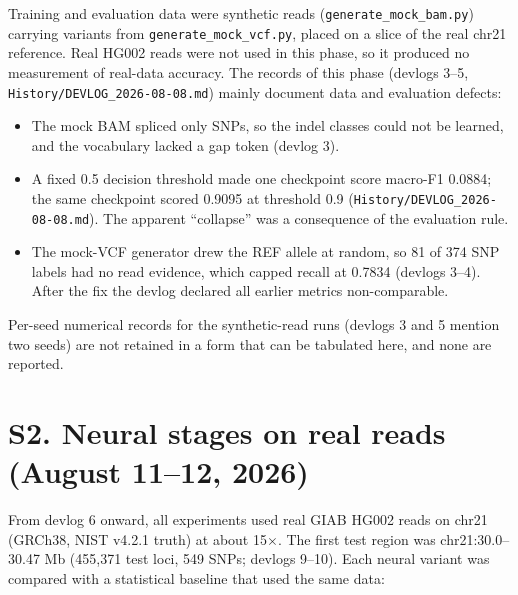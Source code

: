 \documentclass[11pt,a4paper]{article}
\newcommand{\src}[1]{{\small\texttt{#1}}}
\begin{document}
Training and evaluation data were synthetic reads (\src{generate\_mock\_bam.py}) carrying
variants from \src{generate\_mock\_vcf.py}, placed on a slice of the real chr21 reference. Real
HG002 reads were not used in this phase, so it produced no measurement of real-data accuracy.
The records of this phase (devlogs 3--5, \src{History/DEVLOG\_2026-08-08.md}) mainly document
data and evaluation defects:
\begin{itemize}[leftmargin=1.4em,itemsep=1pt]
\item The mock BAM spliced only SNPs, so the indel classes could not be learned, and the
  vocabulary lacked a gap token (devlog 3).
\item A fixed 0.5 decision threshold made one checkpoint score macro-F1 0.0884; the same
  checkpoint scored 0.9095 at threshold 0.9 (\src{History/DEVLOG\_2026-08-08.md}). The apparent
  ``collapse'' was a consequence of the evaluation rule.
\item The mock-VCF generator drew the REF allele at random, so 81 of 374 SNP labels had no read
  evidence, which capped recall at 0.7834 (devlogs 3--4). After the fix the devlog declared all
  earlier metrics non-comparable.
\end{itemize}
Per-seed numerical records for the synthetic-read runs (devlogs 3 and 5 mention two seeds) are
not retained in a form that can be tabulated here, and none are reported.

\section{S2. Neural stages on real reads (August 11--12, 2026)}

From devlog 6 onward, all experiments used real GIAB HG002 reads on chr21 (GRCh38, NIST v4.2.1
truth) at about 15$\times$. The first test region was chr21:30.0--30.47 Mb (455,371 test loci,
549 SNPs; devlogs 9--10). Each neural variant was compared with a statistical baseline that used
the same data:
\end{document}
